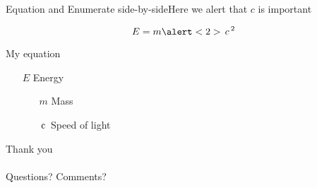 \documentclass[aspectratio=169]{laplace-beamer}
\begin{document}
\begin{frame}{Equation and Enumerate side-by-side}{Here we alert that $c$ is important}
  \begin{minipage}[c]{0.45\textwidth}
    \begin{equation*}
      \label{eq:1}
      E=m\alert<2>{\tikzmarktext{speed1}{$c$}}^{2}
    \end{equation*}
  \end{minipage}
  \hfill
  \begin{minipage}[c]{0.45\textwidth}
    \centering
    \begin{block}{My equation}
      \begin{itemize}
        \item[$E$] Energy
              \begin{itemize}
                \item[$m$] Mass
                \item[$\tikzmarktext{speed2}{c}$] Speed of light
              \end{itemize}
      \end{itemize}
    \end{block}
  \end{minipage}
\end{frame}

\begin{frame}[plain]
  \endpage%
  \centering
  Thank you
\\~\\
  Questions? Comments?
  \\~\\
  \insertauthor
\end{frame}
\end{document}
